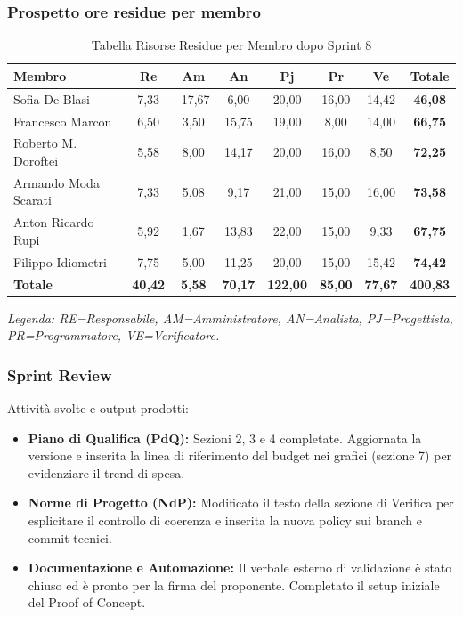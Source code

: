 \subsubsection{Prospetto ore residue per membro}
\begin{table}[H]
    \centering
    \renewcommand{\arraystretch}{1.3}
    \begin{tabularx}{\textwidth}{|X|c|c|c|c|c|c|c|}
        \hline
        \textbf{Membro} & \textbf{Re} & \textbf{Am} & \textbf{An} &
        \textbf{Pj} & \textbf{Pr} & \textbf{Ve} & \textbf{Totale} \\
        \hline
        Sofia De Blasi       &  7,33 & -17,67 &  6,00 & 20,00 & 16,00 & 14,42 & \textbf{46,08} \\
        Francesco Marcon     &  6,50 &  3,50 & 15,75 & 19,00 &  8,00 & 14,00 & \textbf{66,75} \\
        Roberto M. Doroftei  &  5,58 &  8,00 & 14,17 & 20,00 & 16,00 &  8,50 & \textbf{72,25} \\
        Armando Moda Scarati &  7,33 &  5,08 &  9,17 & 21,00 & 15,00 & 16,00 & \textbf{73,58} \\
        Anton Ricardo Rupi   &  5,92 &  1,67 & 13,83 & 22,00 & 15,00 &  9,33 & \textbf{67,75} \\
        Filippo Idiometri    &  7,75 &  5,00 & 11,25 & 20,00 & 15,00 & 15,42 & \textbf{74,42} \\
        \hline
        \textbf{Totale} &
        \textbf{40,42} & \textbf{5,58} & \textbf{70,17} &
        \textbf{122,00} & \textbf{85,00} & \textbf{77,67} &
        \textbf{400,83} \\
        \hline
    \end{tabularx}
    \begin{minipage}{\textwidth}
        \smallskip
        \footnotesize\textit{Legenda: RE=Responsabile, AM=Amministratore,
        AN=Analista, PJ=Progettista, PR=Programmatore, VE=Verificatore.}
    \end{minipage}
    \caption{Tabella Risorse Residue per Membro dopo Sprint 8}
\end{table}

\subsubsection{Sprint Review}
Attività svolte e output prodotti:
\begin{itemize}
    \item \textbf{Piano di Qualifica (PdQ):} Sezioni 2, 3 e 4 completate. Aggiornata la versione e inserita la linea di riferimento del budget nei grafici (sezione 7) per evidenziare il trend di spesa.
    \item \textbf{Norme di Progetto (NdP):} Modificato il testo della sezione di Verifica per esplicitare il controllo di coerenza e inserita la nuova policy sui branch e commit tecnici.
    \item \textbf{Documentazione e Automazione:} Il verbale esterno di validazione è stato chiuso ed è pronto per la firma del proponente. Completato il setup iniziale del Proof of Concept.
\end{itemize}

